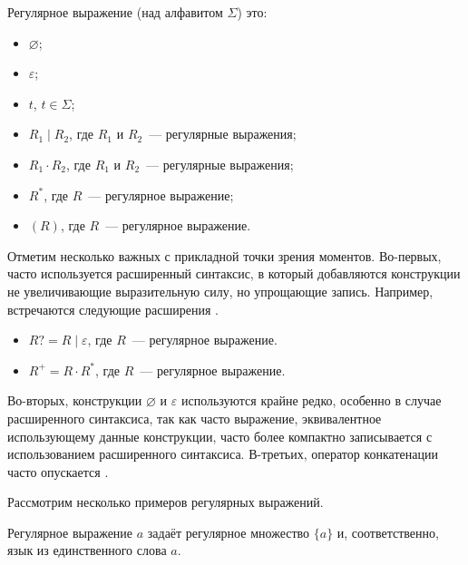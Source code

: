 \begin{definition}
    Регулярное выражение (над алфавитом $\Sigma$) это:
    \begin{itemize}
        \item $\varnothing$;
        \item $\varepsilon$;
        \item $t$, $t \in \Sigma$;
        \item $R_1 \mid R_2$, где $R_1$ и $R_2$~--- регулярные выражения;
        \item $R_1 \cdot R_2$, где $R_1$ и $R_2$~--- регулярные выражения;
        \item $R^*$, где $R$~--- регулярное выражение;
        \item $(R)$, где $R$~--- регулярное выражение.
    \end{itemize}
\end{definition}

Отметим несколько важных с прикладной точки зрения моментов.
Во-первых, часто используется расширенный синтаксис, в который добавляются конструкции не увеличивающие выразительную силу, но упрощающие запись.
Например, встречаются следующие расширения%
.
\begin{itemize}
    \item $R? = R \mid \varepsilon$, где $R$~--- регулярное выражение.
    \item $R^+ = R \cdot R^*$, где $R$~--- регулярное выражение.
\end{itemize}

Во-вторых, конструкции $\varnothing$ и $\varepsilon$ используются крайне редко, особенно в случае расширенного синтаксиса, так как часто выражение, эквивалентное использующему данные конструкции, часто более компактно записывается с использованием расширенного синтаксиса.
В-третьих, оператор конкатенации часто опускается%
.

Рассмотрим несколько примеров регулярных выражений.
\begin{example}
    Регулярное выражение $a$ задаёт регулярное множество $\{a\}$ и, соответственно, язык из единственного слова $a$.
\end{example}


